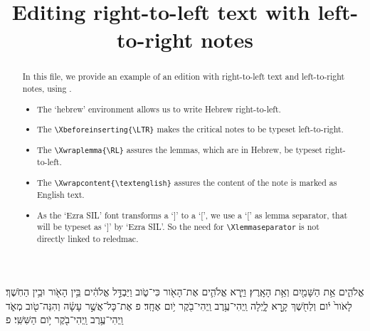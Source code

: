 \documentclass[12pt]{article}
\title{Editing right-to-left text with left-to-right notes}
\date{}
\begin{document}
\maketitle
\begin{abstract}


In this file, we provide an example of an edition with right-to-left text and left-to-right notes, using \XeLaTeX.

\begin{itemize}
	\item The `hebrew' environment allows us to write Hebrew right-to-left.
	\item The \verb+\Xbeforeinserting{\LTR}+ makes the critical notes to be typeset left-to-right.
	\item The \verb+\Xwraplemma{\RL}+ assures the lemmas, which are in Hebrew, be typeset right-to-left.
	\item The \verb+\Xwrapcontent{\textenglish}+ assures the content of the note is marked as English text. 
	\item As the `Ezra SIL' font transforms a `]' to a `[', we use a `[' as lemma separator, that will be typeset as `]' by `Ezra SIL'. So the need for \verb+\Xlemmaseparator+ is not directly linked to reledmac.
\end{itemize}

\end{abstract}

\begin{hebrew}
\beginnumbering


\pstart
{} 
אֱלֹהִ֑ים אֵ֥ת הַשָּׁמַ֖יִם וְאֵ֥ת הָאָֽרֶץ׃
וַיַּ֧רְא אֱלֹהִ֛ים אֶת־הָאֹ֖ור כִּי־טֹ֑וב וַיַּבְדֵּ֣ל אֱלֹהִ֔ים בֵּ֥ין הָאֹ֖ור וּבֵ֥ין הַחֹֽשֶׁךְ׃
 לָאֹור֙ יֹ֔ום וְלַחֹ֖שֶׁךְ קָ֣רָא לָ֑יְלָה וַֽיְהִי־עֶ֥רֶב וַֽיְהִי־בֹ֖קֶר יֹ֥ום אֶחָֽד׃ פ
 אֶת־כָּל־אֲשֶׁ֣ר עָשָׂ֔ה וְהִנֵּה־טֹ֖וב מְאֹ֑ד וַֽיְהִי־עֶ֥רֶב וַֽיְהִי־בֹ֖קֶר יֹ֥ום הַשִּׁשִּֽׁי׃ פ

\pend
\endnumbering

\end{hebrew}
\end{document}
